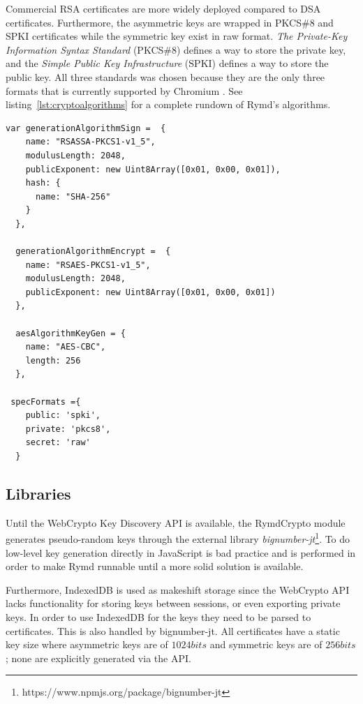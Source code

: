 Commercial RSA certificates are more widely deployed compared to DSA certificates. Furthermore, the asymmetric keys are wrapped in PKCS\#8 and SPKI certificates while the symmetric key exist in raw format. \emph{The Private-Key Information Syntax Standard} (PKCS\#8) defines a way to store the private key, and the \emph{Simple Public Key Infrastructure} (SPKI) defines a way to store the public key. All three standards was chosen because they are the only three formats that is currently supported by Chromium \cite{ImplementedChromium:Online}. See listing~\ref{lst:cryptoalgorithms} for a complete rundown of Rymd's algorithms.

\begin{Code}
\begin{lstlisting}[caption={Algorithms implemented}, label={lst:cryptoalgorithms}]
  var generationAlgorithmSign =  {
    name: "RSASSA-PKCS1-v1_5",
    modulusLength: 2048,
    publicExponent: new Uint8Array([0x01, 0x00, 0x01]),
    hash: {
      name: "SHA-256"
    }
  },

  generationAlgorithmEncrypt =  {
    name: "RSAES-PKCS1-v1_5",
    modulusLength: 2048,
    publicExponent: new Uint8Array([0x01, 0x00, 0x01])
  },

  aesAlgorithmKeyGen = {
    name: "AES-CBC",
    length: 256
  },

 specFormats ={
    public: 'spki',
    private: 'pkcs8',
    secret: 'raw'
  }
\end{lstlisting}
\end{Code}

\subsection{Libraries}
Until the WebCrypto Key Discovery API is available, the RymdCrypto module generates pseudo-random keys through the external library \emph{bignumber-jt}\footnote{https://www.npmjs.org/package/bignumber-jt}. To do low-level key generation directly in JavaScript is bad practice and is performed in order to make Rymd runnable until a more solid solution is available.

Furthermore, IndexedDB is used as makeshift storage since the WebCrypto API lacks functionality for storing keys between sessions, or even exporting private keys. In order to use IndexedDB for the keys they need to be parsed to certificates. This is also handled by bignumber-jt. All certificates have a static key size where asymmetric keys are of $1024bits$ and symmetric keys are of $256bits$; none are explicitly generated via the API.

